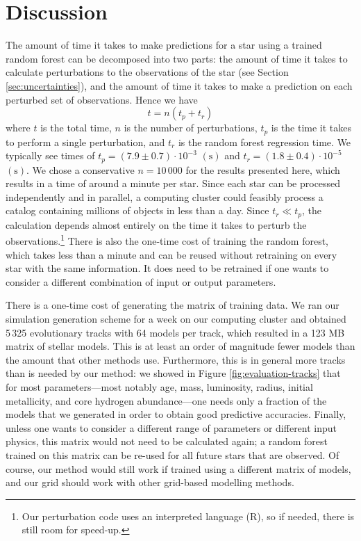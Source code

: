 \documentclass[manuscript,linenumbers]{aastex6}
\newif\ifref
\newcommand{\mb}[1]{\ifref\boldmath\textbf{#1}\unboldmath\else #1\fi}
\begin{document}
\section{Discussion}
The amount of time it takes to make predictions for a star using a trained random forest can be decomposed into two parts: the amount of time it takes to calculate perturbations to the observations of the star \mb{(see Section \ref{sec:uncertainties})}, and the amount of time it takes to make a prediction on each perturbed set of observations. Hence we have
\begin{equation}
    t = n(t_p + t_r)
\end{equation}
where $t$ is the total time, $n$ is the number of perturbations, $t_p$ is the time it takes to perform a single perturbation, and $t_r$ is the random forest regression time. We typically see times of $t_p = (7.9 \pm 0.7) \cdot 10^{-3}$ $(\si{\s})$ and $t_r = (1.8 \pm 0.4) \cdot 10^{-5}$ $(\si{\s})$. We chose a conservative $n=10\,000$ for the results presented here, which results in a time of around a minute per star. Since each star can be processed independently and in parallel, a computing cluster could feasibly process a catalog containing millions of objects in less than a day. Since \mb{$t_r \ll t_p$}, the calculation depends almost entirely on the time it takes to perturb the observations.\footnote{Our perturbation code uses an interpreted language (R), so if needed, there is still room for speed-up.} There is also the one-time cost of training the random forest, which takes less than a minute and can be reused without retraining on every star with the same information. It does need to be retrained if one wants to consider a different combination of input or output parameters. 

There is a one-time cost of generating the matrix of training data. We ran our simulation generation scheme for a week on our computing cluster and obtained 5\,325 evolutionary tracks with 64 models per track, \mb{which resulted in a} 123 MB \mb{matrix of stellar models}. This is at least an order of magnitude fewer models than the amount that other methods use. Furthermore, this is in general more tracks than is needed by our method: we showed in Figure \ref{fig:evaluation-tracks} that for most parameters---most notably age, mass, luminosity, radius, initial metallicity, and core hydrogen abundance---one needs only a fraction of the models that we generated in order to obtain good predictive accuracies. Finally, unless one wants to consider a different range of parameters or different input physics, this matrix would not need to be calculated again; a random forest trained on this matrix can be re-used for all future stars that are observed. Of course, our method would still work if trained using a different matrix of models, and our grid should work with other grid-based modelling methods. 
\end{document}
